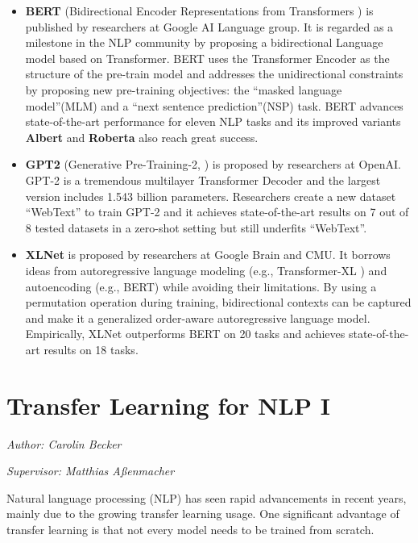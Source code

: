 \documentclass[]{krantz}
\begin{document}
\begin{itemize}
\item
  \textbf{BERT} (Bidirectional Encoder Representations from Transformers \citet{bert}) is published by researchers at Google AI Language group.
  It is regarded as a milestone in the NLP community by proposing a bidirectional Language model based on Transformer. BERT uses the Transformer Encoder as the structure of the pre-train model and addresses the unidirectional constraints by proposing new pre-training objectives: the ``masked language model''(MLM) and a ``next sentence prediction''(NSP) task. BERT advances state-of-the-art performance for eleven NLP tasks and its improved variants \textbf{Albert} \citet{lan2019albert} and \textbf{Roberta} \citet{liu2019roberta} also reach great success.
\item
  \textbf{GPT2} (Generative Pre-Training-2, \citet{radford2019gpt2}) is proposed by researchers at OpenAI. GPT-2 is a tremendous multilayer Transformer Decoder and the largest version includes 1.543 billion parameters. Researchers create a new dataset ``WebText'' to train GPT-2 and it achieves state-of-the-art results on 7 out of 8 tested datasets in a zero-shot setting but still underfits ``WebText''.
\item
  \textbf{XLNet} is proposed by researchers at Google Brain and CMU\citep{yang2019xlnet}. It borrows ideas from autoregressive language modeling (e.g., Transformer-XL \citet{dai2019transformer}) and autoencoding (e.g., BERT) while avoiding their limitations. By using a permutation operation during training, bidirectional contexts can be captured and make it a generalized order-aware autoregressive language model. Empirically, XLNet outperforms BERT on 20 tasks and achieves state-of-the-art results on 18 tasks.
\end{itemize}

\hypertarget{transfer-learning-for-nlp-i}{%
\chapter{Transfer Learning for NLP I}\label{transfer-learning-for-nlp-i}}

\emph{Author: Carolin Becker}

\emph{Supervisor: Matthias Aßenmacher}

Natural language processing (NLP) has seen rapid advancements in recent years, mainly due to the growing transfer learning usage.
One significant advantage of transfer learning is that not every model needs to be trained from scratch.
\end{document}
